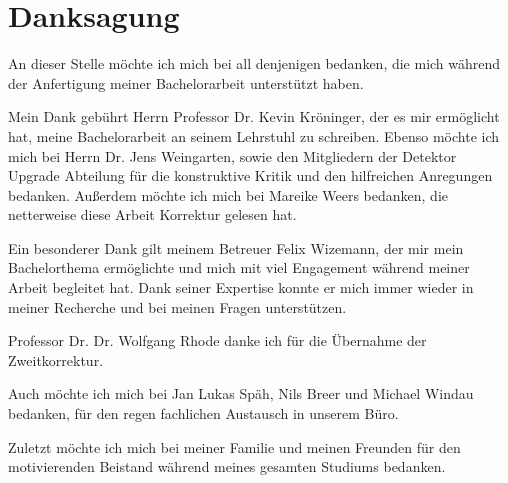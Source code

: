 \thispagestyle{empty}
\section*{Danksagung}

An dieser Stelle möchte ich mich bei all denjenigen bedanken, die mich während
der Anfertigung meiner Bachelorarbeit unterstützt haben.

Mein Dank gebührt Herrn Professor Dr. Kevin Kröninger, der es mir ermöglicht hat,
meine Bachelorarbeit an seinem Lehrstuhl zu schreiben.
Ebenso möchte ich mich bei Herrn Dr. Jens Weingarten, sowie den Mitgliedern der
Detektor Upgrade Abteilung für die konstruktive Kritik und den hilfreichen Anregungen bedanken.
Außerdem möchte ich mich bei Mareike Weers bedanken, die netterweise diese Arbeit Korrektur
gelesen hat.

Ein besonderer Dank gilt meinem Betreuer Felix Wizemann, der mir
mein Bachelorthema ermöglichte und mich mit viel Engagement
während meiner Arbeit begleitet hat. Dank seiner Expertise konnte er mich immer wieder in meiner
Recherche und bei meinen Fragen unterstützen.

Professor Dr. Dr. Wolfgang Rhode danke ich für die Übernahme der Zweitkorrektur.

Auch möchte ich mich bei Jan Lukas Späh, Nils Breer und Michael Windau bedanken, für
den regen fachlichen Austausch in unserem Büro.

Zuletzt möchte ich mich bei meiner Familie und meinen Freunden für den motivierenden Beistand
während meines gesamten Studiums bedanken.
